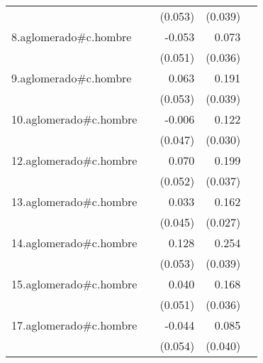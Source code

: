 {\begin{longtable}{l*{4}{D{.}{.}{-1}}}
            &                     &     (0.053)         &     (0.039)         &                     \\
\addlinespace
8.aglomerado#c.hombre&                     &      -0.053         &       0.073\sym{*}  &                     \\
            &                     &     (0.051)         &     (0.036)         &                     \\
\addlinespace
9.aglomerado#c.hombre&                     &       0.063         &       0.191\sym{***}&                     \\
            &                     &     (0.053)         &     (0.039)         &                     \\
\addlinespace
10.aglomerado#c.hombre&                     &      -0.006         &       0.122\sym{***}&                     \\
            &                     &     (0.047)         &     (0.030)         &                     \\
\addlinespace
12.aglomerado#c.hombre&                     &       0.070         &       0.199\sym{***}&                     \\
            &                     &     (0.052)         &     (0.037)         &                     \\
\addlinespace
13.aglomerado#c.hombre&                     &       0.033         &       0.162\sym{***}&                     \\
            &                     &     (0.045)         &     (0.027)         &                     \\
\addlinespace
14.aglomerado#c.hombre&                     &       0.128\sym{*}  &       0.254\sym{***}&                     \\
            &                     &     (0.053)         &     (0.039)         &                     \\
\addlinespace
15.aglomerado#c.hombre&                     &       0.040         &       0.168\sym{***}&                     \\
            &                     &     (0.051)         &     (0.036)         &                     \\
\addlinespace
17.aglomerado#c.hombre&                     &      -0.044         &       0.085\sym{*}  &                     \\
            &                     &     (0.054)         &     (0.040)         &                     \\

\end{longtable}}
